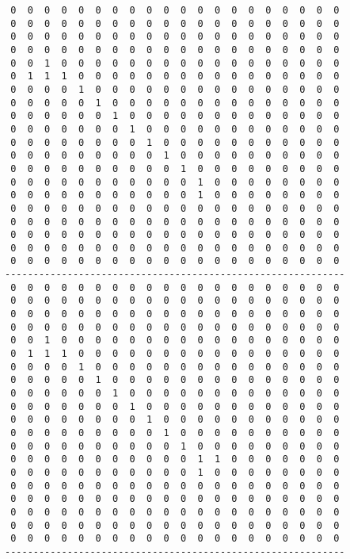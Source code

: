 \begin{verbatim}
 0  0  0  0  0  0  0  0  0  0  0  0  0  0  0  0  0  0  0  0
 0  0  0  0  0  0  0  0  0  0  0  0  0  0  0  0  0  0  0  0
 0  0  0  0  0  0  0  0  0  0  0  0  0  0  0  0  0  0  0  0
 0  0  0  0  0  0  0  0  0  0  0  0  0  0  0  0  0  0  0  0
 0  0  1  0  0  0  0  0  0  0  0  0  0  0  0  0  0  0  0  0
 0  1  1  1  0  0  0  0  0  0  0  0  0  0  0  0  0  0  0  0
 0  0  0  0  1  0  0  0  0  0  0  0  0  0  0  0  0  0  0  0
 0  0  0  0  0  1  0  0  0  0  0  0  0  0  0  0  0  0  0  0
 0  0  0  0  0  0  1  0  0  0  0  0  0  0  0  0  0  0  0  0
 0  0  0  0  0  0  0  1  0  0  0  0  0  0  0  0  0  0  0  0
 0  0  0  0  0  0  0  0  1  0  0  0  0  0  0  0  0  0  0  0
 0  0  0  0  0  0  0  0  0  1  0  0  0  0  0  0  0  0  0  0
 0  0  0  0  0  0  0  0  0  0  1  0  0  0  0  0  0  0  0  0
 0  0  0  0  0  0  0  0  0  0  0  1  0  0  0  0  0  0  0  0
 0  0  0  0  0  0  0  0  0  0  0  1  0  0  0  0  0  0  0  0
 0  0  0  0  0  0  0  0  0  0  0  0  0  0  0  0  0  0  0  0
 0  0  0  0  0  0  0  0  0  0  0  0  0  0  0  0  0  0  0  0
 0  0  0  0  0  0  0  0  0  0  0  0  0  0  0  0  0  0  0  0
 0  0  0  0  0  0  0  0  0  0  0  0  0  0  0  0  0  0  0  0
 0  0  0  0  0  0  0  0  0  0  0  0  0  0  0  0  0  0  0  0
------------------------------------------------------------
 0  0  0  0  0  0  0  0  0  0  0  0  0  0  0  0  0  0  0  0
 0  0  0  0  0  0  0  0  0  0  0  0  0  0  0  0  0  0  0  0
 0  0  0  0  0  0  0  0  0  0  0  0  0  0  0  0  0  0  0  0
 0  0  0  0  0  0  0  0  0  0  0  0  0  0  0  0  0  0  0  0
 0  0  1  0  0  0  0  0  0  0  0  0  0  0  0  0  0  0  0  0
 0  1  1  1  0  0  0  0  0  0  0  0  0  0  0  0  0  0  0  0
 0  0  0  0  1  0  0  0  0  0  0  0  0  0  0  0  0  0  0  0
 0  0  0  0  0  1  0  0  0  0  0  0  0  0  0  0  0  0  0  0
 0  0  0  0  0  0  1  0  0  0  0  0  0  0  0  0  0  0  0  0
 0  0  0  0  0  0  0  1  0  0  0  0  0  0  0  0  0  0  0  0
 0  0  0  0  0  0  0  0  1  0  0  0  0  0  0  0  0  0  0  0
 0  0  0  0  0  0  0  0  0  1  0  0  0  0  0  0  0  0  0  0
 0  0  0  0  0  0  0  0  0  0  1  0  0  0  0  0  0  0  0  0
 0  0  0  0  0  0  0  0  0  0  0  1  1  0  0  0  0  0  0  0
 0  0  0  0  0  0  0  0  0  0  0  1  0  0  0  0  0  0  0  0
 0  0  0  0  0  0  0  0  0  0  0  0  0  0  0  0  0  0  0  0
 0  0  0  0  0  0  0  0  0  0  0  0  0  0  0  0  0  0  0  0
 0  0  0  0  0  0  0  0  0  0  0  0  0  0  0  0  0  0  0  0
 0  0  0  0  0  0  0  0  0  0  0  0  0  0  0  0  0  0  0  0
 0  0  0  0  0  0  0  0  0  0  0  0  0  0  0  0  0  0  0  0
------------------------------------------------------------
\end{verbatim}